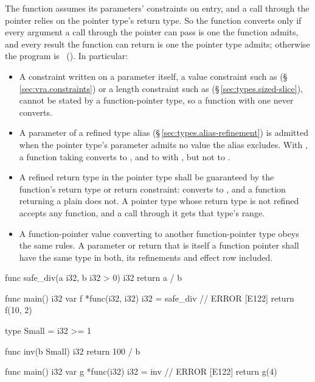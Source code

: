 \pnum
The function assumes its parameters' constraints on entry, and a call through the pointer relies on
the pointer type's return type.  So the function converts only if every argument a call through
the pointer can pass is one the function admits, and every result the function can return is one
the pointer type admits; otherwise the program is \illformed{}~().  In particular:
\begin{itemize}
  \item A constraint written on a parameter itself, a value constraint such as 
        (\S\,\ref{sec:vra.constraints}) or a length constraint such as 
        (\S\,\ref{sec:types.sized-slice}), cannot be stated by a function-pointer type, so a
        function with one never converts.
  \item A parameter of a refined type alias (\S\,\ref{sec:types.alias-refinement}) is admitted when
        the pointer type's parameter admits no value the alias excludes.  With
        , a function taking  converts to
        , and to  with
        , but not to .
  \item A refined return type in the pointer type shall be guaranteed by the function's return
        type or return constraint:  converts to ,
        and a function returning a plain  does not.  A pointer type whose return type is
        not refined accepts any function, and a call through it gets that type's range.
  \item A function-pointer value converting to another function-pointer type obeys the same
        rules.  A parameter or return that is itself a function pointer shall have the same type
        in both, its refinements and effect row included.
\end{itemize}

\begin{laincode}
func safe_div(a i32, b i32 > 0) i32 { return a / b }

func main() i32 {
    var f *func(i32, i32) i32 = safe_div    // ERROR [E122]
    return f(10, 2)
}
\end{laincode}

\begin{laincode}
type Small = i32 >= 1

func inv(b Small) i32 { return 100 / b }

func main() i32 {
    var g *func(i32) i32 = inv    // ERROR [E122]
    return g(4)
}
\end{laincode}

